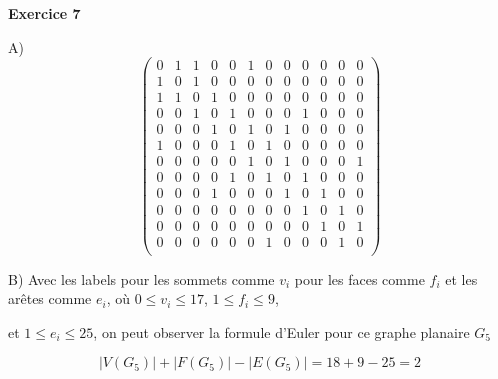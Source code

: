 \documentclass{article}
\begin{document}
\textbf{Exercice 7}

A)
\[
\left(
\begin{array}{*{12}{c}}
0 & 1 & 1 & 0 & 0 & 1 & 0 & 0 & 0 & 0 & 0 & 0\\
1 & 0 & 1 & 0 & 0 & 0 & 0 & 0 & 0 & 0 & 0 & 0\\
1 & 1 & 0 & 1 & 0 & 0 & 0 & 0 & 0 & 0 & 0 & 0\\
0 & 0 & 1 & 0 & 1 & 0 & 0 & 0 & 1 & 0 & 0 & 0\\
0 & 0 & 0 & 1 & 0 & 1 & 0 & 1 & 0 & 0 & 0 & 0\\
1 & 0 & 0 & 0 & 1 & 0 & 1 & 0 & 0 & 0 & 0 & 0\\
0 & 0 & 0 & 0 & 0 & 1 & 0 & 1 & 0 & 0 & 0 & 1\\
0 & 0 & 0 & 0 & 1 & 0 & 1 & 0 & 1 & 0 & 0 & 0\\ 
0 & 0 & 0 & 1 & 0 & 0 & 0 & 1 & 0 & 1 & 0 & 0\\ 
0 & 0 & 0 & 0 & 0 & 0 & 0 & 0 & 1 & 0 & 1 & 0\\ 
0 & 0 & 0 & 0 & 0 & 0 & 0 & 0 & 0 & 1 & 0 & 1\\
0 & 0 & 0 & 0 & 0 & 0 & 1 & 0 & 0 & 0 & 1 & 0\\
\end{array}
\right)
\]
\vspace{0.1cm}

B)
Avec les labels pour les sommets comme $v_i$ pour les faces comme $f_i$ et les arêtes comme $e_i$, où $0 \leq v_i \leq 17$, $1 \leq f_i \leq 9$, 

et $1 \leq e_i \leq 25$, on peut observer la formule d'Euler pour ce graphe planaire $G_5$

$$|V(G_5)| + |F(G_5)|- |E(G_5)| = 18 + 9 - 25= 2$$
\end{document}
